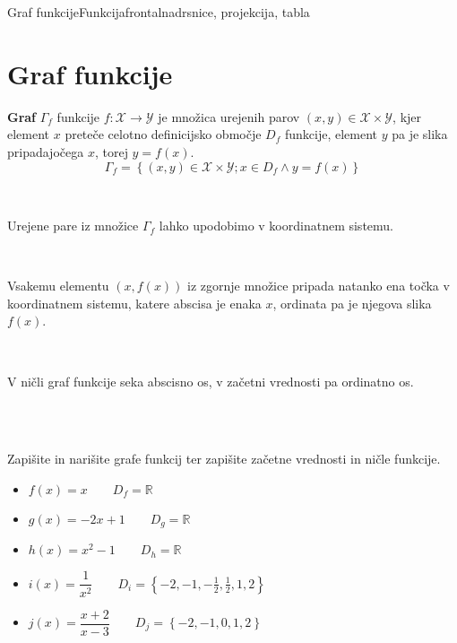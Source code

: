 \begin{priprava}{3}{}{Graf funkcije}{Funkcija}{frontalna}{drsnice, projekcija, tabla}


        \section{Graf funkcije}

            \textbf{Graf} $\Gamma_f$ funkcije $f:\mathcal{X}\to\mathcal{Y}$ je množica urejenih parov $(x,y)\in\mathcal{X}\times\mathcal{Y}$, 
                kjer element $x$ preteče celotno definicijsko območje $D_f$ funkcije, element $y$ pa je slika pripadajočega $x$, torej $y=f(x)$.
            $$ \Gamma_f=\left\{(x,y)\in\mathcal{X}\times\mathcal{Y}; x\in D_f \land y=f(x)\right\} $$
        
~

                Urejene pare iz množice $\Gamma_f$ lahko upodobimo v koordinatnem sistemu. 
               
               ~

                Vsakemu elementu $(x,f(x))$ iz zgornje množice pripada natanko ena točka v koordinatnem sistemu, 
                katere abscisa je enaka $x$, ordinata pa je njegova slika $f(x)$.

                ~

                V ničli graf funkcije seka abscisno os, v začetni vrednosti pa ordinatno os.


~\\~\\

            \begin{naloga}
                Zapišite in narišite grafe funkcij ter zapišite začetne vrednosti in ničle funkcije.
                    \begin{itemize}
                        \item $f(x)=x \quad \quad D_f=\mathbb{R}$ 
                        \item $g(x)=-2x+1 \quad \quad D_g=\mathbb{R}$ 
                        \item $h(x)=x^2-1 \quad \quad D_h=\mathbb{R}$ 
                        \item $i(x)=\dfrac{1}{x^2} \quad \quad D_i=\left\{-2, -1, -\frac{1}{2}, \frac{1}{2}, 1, 2\right\}$ 
                        \item $j(x)=\dfrac{x+2}{x-3} \quad \quad D_j=\left\{-2, -1, 0, 1, 2\right\}$ 
                    \end{itemize}
            \end{naloga}                    




\end{priprava}